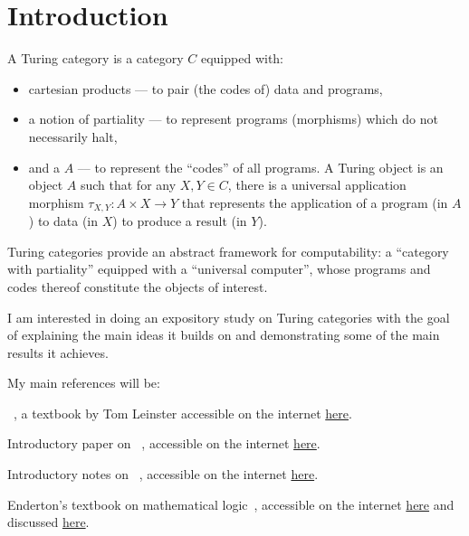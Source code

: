 {}%
\section*{Introduction}

A Turing category is a category $C$ equipped with:
\begin{itemize}
  \item cartesian products --- to pair (the codes of) data and programs,
  \item a notion of partiality --- to represent programs (morphisms)
    which do not necessarily halt,
  \item and a  $A$ --– to represent the
    ``codes'' of all programs.
    A Turing object is an object $A$ such that for any $X, Y \in C$,
    there is a universal application morphism
    $\tau_{X, Y} : A \times X \to Y$
    that represents the application of a program (in $A$) to data (in $X$)
    to produce a result (in $Y$).~\cite{TURING-CATEGORIES}
\end{itemize}

Turing categories provide an abstract framework for computability:
a ``category with partiality'' equipped with a ``universal computer'',
whose programs and codes thereof constitute the objects of interest.
\cite{TURING-CATEGORIES}

I am interested in doing an expository study on
Turing categories with the goal of explaining
the main ideas it builds on
and demonstrating some of the main
results it achieves.

My main references will be:

\begin{enumarabic}
  \item {}~\cite{CATEGORY-THEORY-TEXT},
    a textbook by Tom Leinster accessible on the internet
    \href{https://arxiv.org/abs/1612.09375}{here}.
  \item Introductory paper on 
    ~\cite{TURING-CATEGORIES},
    accessible on the internet \href{https://doi.org/10.1016/j.apal.2008.04.005}{here}.
  \item Introductory notes on
    ~\cite{APPLICATIVE-STRUCTURES},
    accessible on the internet
    \href{https://link.springer.com/chapter/10.1007/3-540-60164-3_21#citeas}{here}.
  \item Enderton's textbook on mathematical logic~\cite{ENDERTON},
    accessible on the internet \href{https://doi.org/10.1007/978-3-319-20451-2}{here}
    and discussed \href{https://www.logicmatters.net/tyl/booknotes/enderton/}{here}.
\end{enumarabic}

